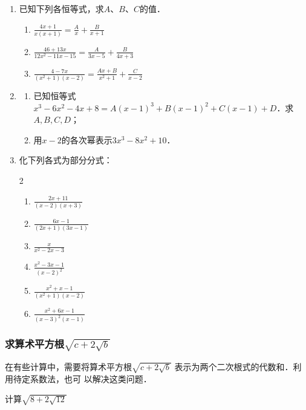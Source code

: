 \begin{ex}
\begin{enumerate}
    \item  已知下列各恒等式，求$A$、$B$、$C$的值．
    \begin{enumerate}
        \item $\frac{4x+1}{x(x+1)}=\frac{A}{x}+\frac{B}{x+1}$
        \item $\frac{46+13x}{12x^2-11x-15}=\frac{A}{3x-5}+\frac{B}{4x+3}$
        \item $\frac{4-7x}{(x^2+1)(x-2)}=\frac{Ax+B}{x^2+1}+\frac{C}{x-2}$
    \end{enumerate}
    \item \begin{enumerate}
        \item 已知恒等式$x^3-6x^2-4x+8=A(x-1)^3+B(x-1)^2+
        C(x-1)+D$．求$A,B,C,D$；
        \item 用$x-2$的各次幂表示$3x^3-8x^2+10$．
    \end{enumerate}

    \item 化下列各式为部分分式：
    \begin{multicols}{2}
        \begin{enumerate}
    \item $\frac{2x+11}{(x-2)(x+3)}$
    \item $\frac{6x-1}{(2x+1)(3x-1)}$
    \item $\frac{x}{x^2-2x-3}$
    \item $\frac{x^2-3x-1}{(x-2)^2}$
    \item $\frac{x^2+x-1}{(x^2+1)(x-2)}$
    \item $\frac{x^2+6x-1}{(x-3)^2(x-1)}$
\end{enumerate}
    \end{multicols}
\end{enumerate}
    
\end{ex}

\subsubsection{求算术平方根$\sqrt{c+2\sqrt{b}}$}
在有些计算中，需要将算术平方根$\sqrt{c+2\sqrt{b}}$
表示为两个二次根式的代数和．利用待定系数法，也可
以解决这类问题．

\begin{example}
计算$\sqrt{8+2\sqrt{12}}$
\end{example}

